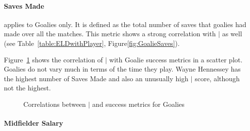 {	 
	\paragraph{Saves Made} applies to Goalies only. It is defined as the total number of saves that goalies had made over all the matches. This metric shows a strong correlation with $\mid$ as well (see Table~\ref{table:ELDwithPlayer}, Figure\ref{fig:GoalieSaves}).  
	
	Figure~\ref{fig:goaliesELD} shows the correlation of $\mid$ with Goalie success metrics in a scatter plot. Goalies do not vary much in terms of the time they play. Wayne Hennessey has the highest number of Saves Made and also an unusually high $\mid$ score, although not the highest. 


	
	\begin{figure}
		\centering     %
		\caption{Correlations between $\mid$ and success metrics for Goalies \label{fig:goaliesELD}}
	\end{figure}


\paragraph{Midfielder Salary} 

}
